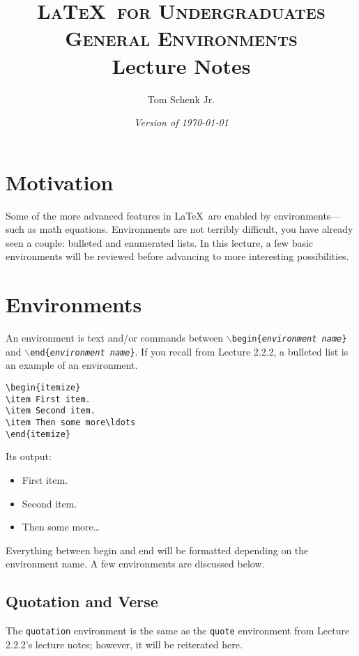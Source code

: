 \documentclass{article}
\title{\textsc{\LaTeX\ for Undergraduates\\
			General Environments} \\
			Lecture Notes}
\author{Tom Schenk Jr.}
\date{\textit{Version of \today}}
\begin{document}
\maketitle

\section{Motivation}

Some of the more advanced features in \LaTeX\ are enabled by environments---such as math equations. Environments are not terribly difficult, you have already seen a couple: bulleted and enumerated lists. In this lecture, a few basic environments will be reviewed before advancing to more interesting possibilities.

\section{Environments}

An environment is text and/or commands between \texttt{$\backslash$begin\{\textit{environment name}\}} and \texttt{$\backslash$end\{\textit{environment name}\}}. If you recall from Lecture 2.2.2, a bulleted list is an example of an environment.
\begin{verbatim}
\begin{itemize}
\item First item.
\item Second item.
\item Then some more\ldots
\end{itemize}
\end{verbatim}
Its output:
\begin{itemize}
\item First item.
\item Second item.
\item Then some more\ldots
\end{itemize}

Everything between begin and end will be formatted depending on the environment name. A few environments are discussed below.

\subsection{Quotation and Verse}

The \texttt{quotation} environment is the same as the \texttt{quote} environment from Lecture 2.2.2's lecture notes; however, it will be reiterated here.
\end{document}
